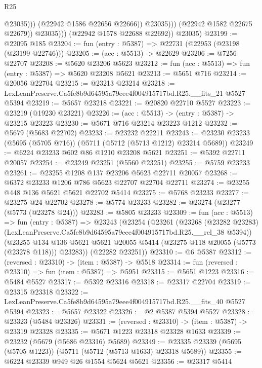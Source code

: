 \begin{lexlean}{R25}
\begin{coremodule}
                              @23035)))
                        (@22942 @1586 @22656 @22666))
                      @23035)))
                (@22942 @1582 @22675 @22679))
              @23035)))
        (@22942 @1578 @22688 @22692))
      @23035)
@23199 := @22095 @185
@23204 := fun (entry : @5387) => @22731 (@22953 (@23198 (@23199 @22746)))
@23205 := (acc : @5513) -> @22629
@23206 := @7256 @22707
@23208 := @5620 @23206 @5623
@23212 := fun (acc : @5513) => fun (entry : @5387) => @5620 @23208 @5621
@23213 := @5651 @716
@23214 := @20056 @22704
@23215 := @23213 @23214
@23218 := LexLeanPreserve.Ca5fe8b9d64595a79eee4f004915717bd.R25.__fits_21 @5527 @5394
@23219 := @5657 @23218
@23221 := @20820 @22710 @5527
@23223 := @23219 (@19230 @23221)
@23226 := (acc : @5513) -> (entry : @5387) -> @23215 @23223
@23230 := @5671 @716 @23214 @23223 @1212
@23232 := @5679 (@5683 @22702)
@23233 := @23232 @22211
@23243 := @23230 @23233 (@5695 (@5705 @716)) (@5711 (@5712 (@5713 @1212) @23214 @5689))
@23249 := @6224 @23233 @602 @86 @1210 @23208 @5621
@23251 := @5392 @22711 @20057
@23254 := @23249 @23251 (@5560 @23251)
@23255 := @5759 @23233
@23261 := @23255 @1208 @137 @23206 @5623 @22711 @20057
@23268 := @6372 @23233 @1206 @786 @5623 @22707 @22704 @22711
@23274 := @23255 @448 @136 @5621 @5621 @22702 @5414
@23275 := @5768 @23233
@23277 := @23275 @24 @22702
@23278 := @5774 @23233
@23282 := @23274 (@23277 (@5773 (@23278 @24)))
@23283 := @5805 @23233
@23309 := fun (acc : @5513) =>
  fun (entry : @5387) =>
  @23243
    (@23254
      (@23261
        (@23268
          (@23282 @23283)
          (LexLeanPreserve.Ca5fe8b9d64595a79eee4f004915717bd.R25.__rel_38 @5394))
        (@23255
          @134
          @136
          @5621
          @5621
          @20055
          @5414
          (@23275 @118 @20055 (@5773 (@23278 @118)))
          @23283))
      (@22282 @23251))
@23310 := @6 @5387
@23312 := (reversed : @23310) -> (item : @5387) -> @5518
@23314 := fun (reversed : @23310) => fun (item : @5387) => @5951
@23315 := @5651 @1223
@23316 := @5484 @5527
@23317 := @5392 @23316
@23318 := @23317 @22704
@23319 := @23315 @23318
@23322 := LexLeanPreserve.Ca5fe8b9d64595a79eee4f004915717bd.R25.__fits_40 @5527 @5394
@23323 := @5657 @23322
@23326 := @2 @5387 @5394 @5527
@23328 := @23323 (@5484 @23326)
@23331 := (reversed : @23310) -> (item : @5387) -> @23319 @23328
@23335 := @5671 @1223 @23318 @23328 @1633
@23339 := @23232 (@5679 (@5686 @23316) @5689)
@23349 := @23335 @23339 (@5695 (@5705 @1223)) (@5711 (@5712 (@5713 @1633) @23318 @5689))
@23355 := @6224 @23339 @949 @26 @1554 @5624 @5621
@23356 := @23317 @5414

\end{coremodule}
\end{lexlean}
